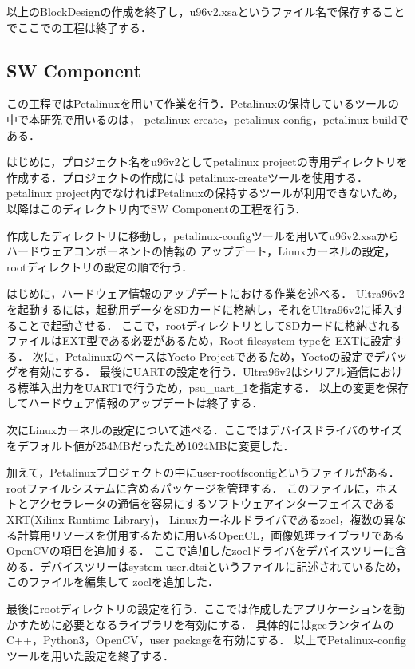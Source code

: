 \documentclass[11pt,a4j]{jreport}
\begin{document}
以上のBlockDesignの作成を終了し，u96v2.xsaというファイル名で保存することでここでの工程は終了する．

\subsection{SW Component}
この工程ではPetalinuxを用いて作業を行う．Petalinuxの保持しているツールの中で本研究で用いるのは，
petalinux-create，petalinux-config，petalinux-buildである．

はじめに，プロジェクト名をu96v2としてpetalinux projectの専用ディレクトリを作成する．プロジェクトの作成には
petalinux-createツールを使用する．petalinux project内でなければPetalinuxの保持するツールが利用できないため，
以降はこのディレクトリ内でSW Componentの工程を行う．

作成したディレクトリに移動し，petalinux-configツールを用いてu96v2.xsaからハードウェアコンポーネントの情報の
アップデート，Linuxカーネルの設定，rootディレクトリの設定の順で行う．

はじめに，ハードウェア情報のアップデートにおける作業を述べる．
Ultra96v2を起動するには，起動用データをSDカードに格納し，それをUltra96v2に挿入することで起動させる．
ここで，rootディレクトリとしてSDカードに格納されるファイルはEXT型である必要があるため，Root filesystem typeを
EXTに設定する．
次に，PetalinuxのベースはYocto Projectであるため，Yoctoの設定でデバッグを有効にする．
最後にUARTの設定を行う．Ultra96v2はシリアル通信における標準入出力をUART1で行うため，psu_uart_1を指定する．
以上の変更を保存してハードウェア情報のアップデートは終了する．

次にLinuxカーネルの設定について述べる．ここではデバイスドライバのサイズをデフォルト値が254MBだったため1024MBに変更した．

加えて，Petalinuxプロジェクトの中にuser-rootfsconfigというファイルがある．rootファイルシステムに含めるパッケージを管理する．
このファイルに，ホストとアクセラレータの通信を容易にするソフトウェアインターフェイスであるXRT(Xilinx Runtime Library)，
Linuxカーネルドライバであるzocl，複数の異なる計算用リソースを併用するために用いるOpenCL，画像処理ライブラリであるOpenCVの項目を追加する．
ここで追加したzoclドライバをデバイスツリーに含める．デバイスツリーはsystem-user.dtsiというファイルに記述されているため，このファイルを編集して
zoclを追加した．

最後にrootディレクトリの設定を行う．ここでは作成したアプリケーションを動かすために必要となるライブラリを有効にする．
具体的にはgccランタイムのC++，Python3，OpenCV，user packageを有効にする．
以上でPetalinux-configツールを用いた設定を終了する．
\end{document}
